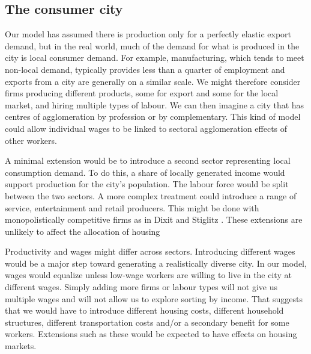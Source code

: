 

\subsection{The consumer city}
Our model has assumed there is production only for a perfectly elastic export demand, but in the real world, much of the demand for what is produced in the city is local consumer demand.  For example, manufacturing, which tends to meet non-local demand, typically provides less than a quarter of employment and exports from a city are generally on a similar scale. 
We might therefore consider firms producing different products, some for export and some for the local market, and hiring multiple types of labour. We can then imagine a city that has centres of agglomeration by profession or by complementary. This kind of model could allow individual wages to be linked to sectoral agglomeration effects of other workers. %

A minimal extension would be to introduce a second sector representing local consumption demand. To do this, a share of locally generated income would support production for the city's population. The labour force would be split between the two sectors. A more complex treatment could introduce a range of service, entertainment and retail producers. This might be done with monopolistically competitive firms as in Dixit and Stiglitz \cite{AvinashK.Dixit1977MCaO}. These extensions are unlikely to affect the allocation of housing

Productivity and wages might differ across sectors. Introducing different wages would be a major step toward generating a realistically diverse city. In our model, wages would equalize unless low-wage workers are willing to live in the city at different wages. Simply adding more firms or labour types will not give us multiple wages and will not allow us to explore sorting by income. That suggests that we would have to introduce different housing costs, different household structures, different transportation costs and/or a secondary benefit for some workers.  Extensions such as these would be expected to have effects on housing markets. %


